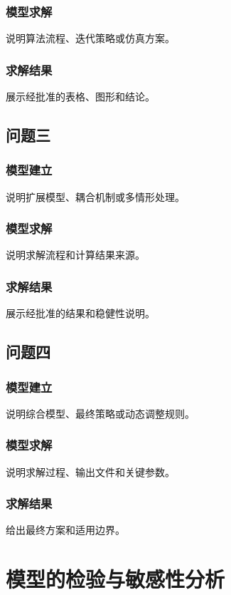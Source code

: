 \documentclass[UTF8,a4paper,12pt]{ctexart}
\begin{document}
\subsubsection{模型求解}
说明算法流程、迭代策略或仿真方案。

\subsubsection{求解结果}
展示经批准的表格、图形和结论。

\subsection{问题三}
\subsubsection{模型建立}
说明扩展模型、耦合机制或多情形处理。

\subsubsection{模型求解}
说明求解流程和计算结果来源。

\subsubsection{求解结果}
展示经批准的结果和稳健性说明。

\subsection{问题四}
\subsubsection{模型建立}
说明综合模型、最终策略或动态调整规则。

\subsubsection{模型求解}
说明求解过程、输出文件和关键参数。

\subsubsection{求解结果}
给出最终方案和适用边界。

\section{模型的检验与敏感性分析}
\end{document}
